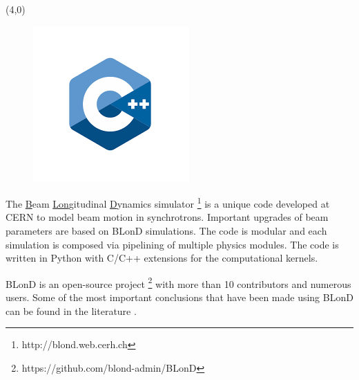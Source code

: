 \begin{frame}
\begin{textblock}{2}
\begin{figure}
		\end{figure}
	\end{textblock}
	\begin{textblock}{2}(4,0)
	\begin{figure}
		\includegraphics[width=\textwidth]{figures/cpp-logo}
	\end{figure}
	\end{textblock}
	\vspace{1.5cm}
	\begin{block}{}
		The \underline{B}eam \underline{Lon}gitudinal \underline{D}ynamics simulator \footnote{http://blond.web.cerh.ch}  is a unique code developed at CERN to model beam motion in synchrotrons. Important upgrades of beam parameters are based on BLonD simulations. The code is modular and each simulation is composed via pipelining of multiple physics modules. The code is written in Python with C/C++ extensions for the computational kernels.
		
		BLonD is an open-source project \footnote{https://github.com/blond-admin/BLonD} with more than 10 contributors and numerous users. Some of the most important conclusions that have been made using BLonD can be found in the literature   .
	\end{block}
	

\end{frame}

